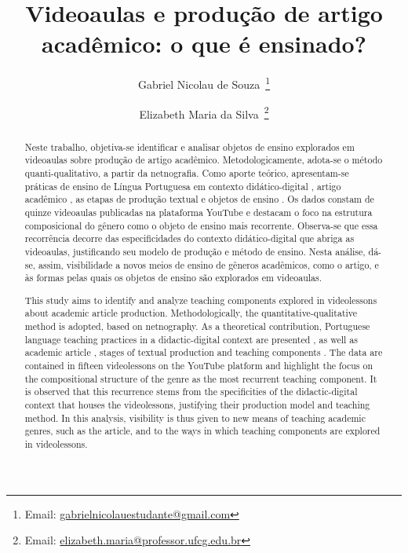 \documentclass[portuguese]{textolivre}
\title{Videoaulas e produção de artigo acadêmico: o que é ensinado?}
\author[1]{Gabriel Nicolau de Souza~\orcid{0009-0007-2591-6321}\thanks{Email: \href{mailto:gabrielnicolauestudante@gmail.com}{gabrielnicolauestudante@gmail.com}}}
\author[1]{Elizabeth Maria da Silva~\orcid{0000-0002-1355-493X}\thanks{Email: \href{mailto:elizabeth.maria@professor.ufcg.edu.br}{elizabeth.maria@professor.ufcg.edu.br}}}
\affil[1]{Universidade Federal de Campina Grande, Academia de Letras, Campina Grande, PB, Brasil.}
\begin{document}
\maketitle
\begin{polyabstract}
\begin{abstract}
Neste trabalho, objetiva-se identificar e analisar
objetos de ensino explorados em videoaulas sobre produção de artigo
acadêmico. Metodologicamente, adota-se o método quanti-qualitativo, a
partir da netnografia. Como aporte teórico, apresentam-se práticas de
ensino de Língua Portuguesa em contexto didático-digital \cite{laurentino2023}, artigo acadêmico \cite{motta-roth2010}, as etapas de
produção textual \cite{antunes2003} e objetos de ensino \cite{linodearaujo2014}. Os dados constam de quinze videoaulas publicadas na plataforma
YouTube e destacam o foco na estrutura composicional do gênero como o
objeto de ensino mais recorrente. Observa-se que essa recorrência
decorre das especificidades do contexto didático-digital que abriga as
videoaulas, justificando seu modelo de produção e método de ensino.
Nesta análise, dá-se, assim, visibilidade a novos meios de ensino de
gêneros acadêmicos, como o artigo, e às formas pelas quais os objetos de
ensino são explorados em videoaulas.
 
\end{abstract}

\begin{english}
\begin{abstract}
  This study aims to identify and analyze teaching
  components explored in videolessons about academic article production.
  Methodologically, the quantitative-qualitative method is adopted, based
  on netnography. As a theoretical contribution, Portuguese language
  teaching practices in a didactic-digital context are presented
  \cite{laurentino2023}, as well as academic article \cite{motta-roth2010}, stages of textual production \cite{antunes2003} and
  teaching components \cite{linodearaujo2014}. The data are contained in
  fifteen videolessons on the YouTube platform and highlight the focus on
  the compositional structure of the genre as the most recurrent teaching
  component. It is observed that this recurrence stems from the
  specificities of the didactic-digital context that houses the
  videolessons, justifying their production model and teaching method. In
  this analysis, visibility is thus given to new means of teaching
  academic genres, such as the article, and to the ways in which teaching
  components are explored in videolessons.
  
\end{abstract}
\end{english}
\end{polyabstract}
\end{document}
